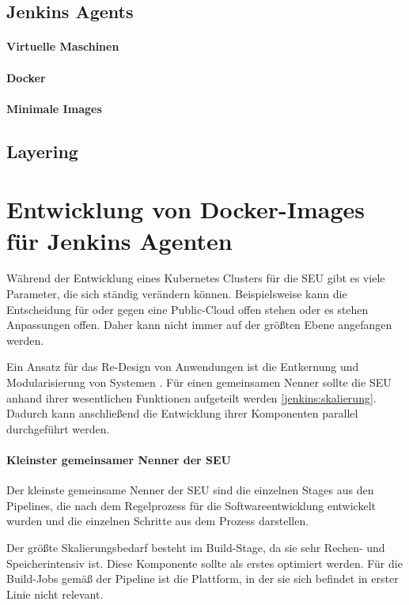 \subsection{Jenkins Agents}

\paragraph{Virtuelle Maschinen}

\paragraph{Docker}

\paragraph{Minimale Images}

\subsection{Layering}

\section{Entwicklung von Docker-Images für Jenkins Agenten}

Während der Entwicklung eines Kubernetes Clusters für die \ac{SEU} gibt es viele Parameter, die sich ständig verändern können. Beispielsweise kann die Entscheidung für oder gegen eine Public-Cloud offen stehen oder es stehen Anpassungen offen. Daher kann nicht immer auf der größten Ebene angefangen werden.

Ein Ansatz für das Re-Design von Anwendungen ist die Entkernung und Modularisierung von Systemen \cite{Bussmann2006}.
Für einen gemeinsamen Nenner sollte die \ac{SEU} anhand ihrer wesentlichen Funktionen aufgeteilt werden \ref{jenkins:skalierung}. Dadurch kann anschließend die Entwicklung ihrer Komponenten parallel durchgeführt werden. 

\paragraph{Kleinster gemeinsamer Nenner der SEU}
Der kleinste gemeinsame Nenner der \ac{SEU} sind die einzelnen Stages aus den Pipelines, die nach dem Regelprozess für die Softwareentwicklung entwickelt wurden und die einzelnen Schritte aus dem Prozess darstellen.

Der größte Skalierungsbedarf besteht im Build-Stage, da sie sehr Rechen- und Speicherintensiv ist. Diese Komponente sollte als erstes optimiert werden.
Für die Build-Jobs gemäß der Pipeline ist die Plattform, in der sie sich befindet in erster Linie nicht relevant. 

